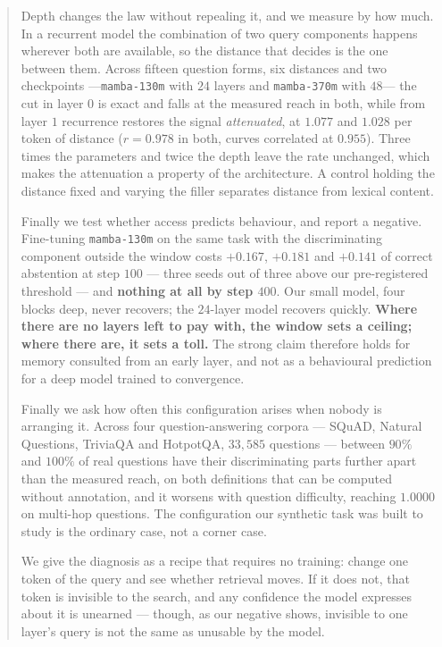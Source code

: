 \documentclass[10pt]{article}
\begin{document}
\begin{abstract}
Depth changes the law without repealing it, and we measure by how much. In a recurrent model the
combination of two query components happens wherever both are available, so the distance that decides
is the one between them. Across fifteen question forms, six distances and two checkpoints
---\texttt{mamba-130m} with $24$ layers and \texttt{mamba-370m} with $48$--- the cut in layer $0$ is
exact and falls at the measured reach in both, while from layer $1$ recurrence restores the signal
\emph{attenuated}, at $1.077$ and $1.028$ per token of distance ($r = 0.978$ in both, curves
correlated at $0.955$). Three times the parameters and twice the depth leave the rate unchanged, which
makes the attenuation a property of the architecture. A control holding the distance fixed and varying
the filler separates distance from lexical content.

Finally we test whether access predicts behaviour, and report a negative. Fine-tuning
\texttt{mamba-130m} on the same task with the discriminating component outside the window costs
$+0.167$, $+0.181$ and $+0.141$ of correct abstention at step $100$ --- three seeds out of three above
our pre-registered threshold --- and \textbf{nothing at all by step $400$}. Our small model, four
blocks deep, never recovers; the $24$-layer model recovers quickly. \textbf{Where there are no layers
left to pay with, the window sets a ceiling; where there are, it sets a toll.} The strong claim
therefore holds for memory consulted from an early layer, and not as a behavioural prediction for a
deep model trained to convergence.

Finally we ask how often this configuration arises when nobody is arranging it. Across four
question-answering corpora --- SQuAD, Natural Questions, TriviaQA and HotpotQA, $33{,}585$ questions ---
between $90\%$ and $100\%$ of real questions have their discriminating parts further apart than the
measured reach, on both definitions that can be computed without annotation, and it worsens with
question difficulty, reaching $\mathbf{1.0000}$ on multi-hop questions. The configuration our synthetic task was built to study is the ordinary case, not a corner
case.

We give the diagnosis as a recipe that requires no training: change one token of the query and see
whether retrieval moves. If it does not, that token is invisible to the search, and any confidence the
model expresses about it is unearned --- though, as our negative shows, invisible to one layer's query
is not the same as unusable by the model.
\end{abstract}
\end{document}
